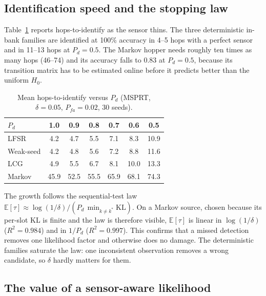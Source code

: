 \subsection{Identification speed and the stopping law}
\label{sec:res-speed}

Table~\ref{tab:hops} reports hops-to-identify as the sensor thins. The three
deterministic in-bank families are identified at 100\% accuracy in 4--5 hops
with a perfect sensor and in 11--13 hops at $P_d=0.5$. The Markov hopper needs
roughly ten times as many hops (46--74) and its accuracy falls to 0.83 at
$P_d=0.5$, because its transition matrix has to be estimated online before it
predicts better than the uniform $H_0$.

\begin{table}[t]
\centering
\caption{Mean hops-to-identify versus $P_d$ (MSPRT, $\delta=0.05$,
$P_{fa}=0.02$, 30 seeds).}
\label{tab:hops}
\begin{tabular}{lcccccc}
\toprule
$P_d$ & 1.0 & 0.9 & 0.8 & 0.7 & 0.6 & 0.5 \\
\midrule
LFSR      & 4.2  & 4.7  & 5.5  & 7.1  & 8.3  & 10.9 \\
Weak-seed & 4.2  & 4.8  & 5.6  & 7.2  & 8.8  & 11.6 \\
LCG       & 4.9  & 5.5  & 6.7  & 8.1  & 10.0 & 13.3 \\
Markov    & 45.9 & 52.5 & 55.5 & 65.9 & 68.1 & 74.3 \\
\bottomrule
\end{tabular}
\end{table}

The growth follows the sequential-test law
$\mathbb{E}[\tau]\approx\log(1/\delta)/(P_d\,\min_{k\neq k^*}\mathrm{KL})$.
On a Markov source, chosen because its per-slot KL is finite and the law is
therefore visible, $\mathbb{E}[\tau]$ is linear in $\log(1/\delta)$
($R^2=0.984$) and in $1/P_d$ ($R^2=0.997$). This confirms that a missed
detection removes one likelihood factor and otherwise does no damage. The
deterministic families saturate the law: one inconsistent observation removes a
wrong candidate, so $\delta$ hardly matters for them.

\subsection{The value of a sensor-aware likelihood}
\label{sec:res-sensor}

